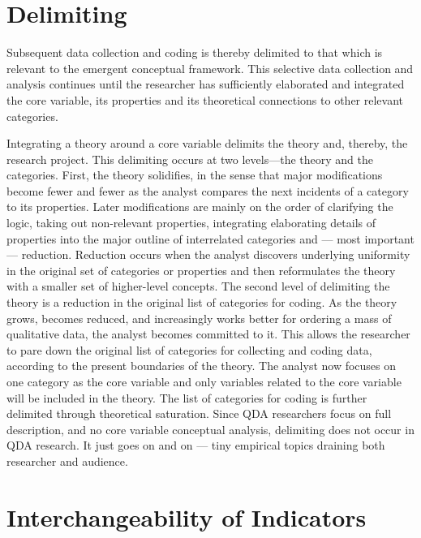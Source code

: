 \section*{Delimiting}

Subsequent data collection and coding is thereby delimited to that which is relevant to the emergent conceptual framework. 
This selective data collection and analysis continues until the researcher has sufficiently elaborated and integrated the core variable, 
its properties and its theoretical connections to other relevant categories.

Integrating a theory around a core variable delimits the theory and, thereby, the research project. 
This delimiting occurs at two levels—the theory and the categories. 
First, the theory solidifies, 
in the sense that major modifications become fewer and fewer as the analyst compares the next incidents of a category to its properties. 
Later modifications are mainly on the order of clarifying the logic, 
taking out non-relevant properties, 
integrating elaborating details of properties into the major outline of interrelated categories and --- most important --- reduction. 
Reduction occurs when the analyst discovers underlying uniformity in the original set of categories or properties and then reformulates the theory with a smaller set of higher-level concepts. 
The second level of delimiting the theory is a reduction in the original list of categories for coding. 
As the theory grows, becomes reduced, 
and increasingly works better for ordering a mass of qualitative data, 
the analyst becomes committed to it.
This allows the researcher to pare down the original list of categories for
collecting and coding data, 
according to the present boundaries of the theory.
The analyst now focuses on one category as the core variable and only
variables related to the core variable will be included in the theory. 
The list of categories for coding is further delimited through theoretical saturation. 
Since QDA researchers focus on full description, 
and no core variable conceptual analysis, 
delimiting does not occur in QDA research. 
It just goes on and on --- tiny empirical topics draining both researcher and audience.

\section*{Interchangeability of Indicators}

